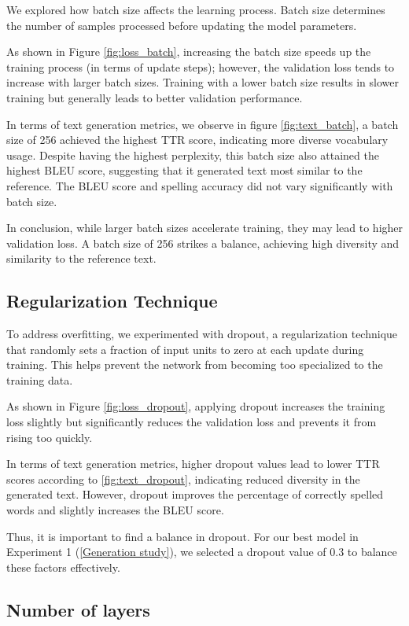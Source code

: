 \documentclass{article}
\begin{document}
We explored how batch size affects the learning process. Batch size determines the number of samples processed before updating the model parameters.

As shown in Figure \ref{fig:loss_batch}, increasing the batch size speeds up the training process (in terms of update steps); however, the validation loss tends to increase with larger batch sizes. Training with a lower batch size results in slower training but generally leads to better validation performance.

In terms of text generation metrics, we observe in figure \ref{fig:text_batch}, a batch size of 256 achieved the highest TTR score, indicating more diverse vocabulary usage. Despite having the highest perplexity, this batch size also attained the highest BLEU score, suggesting that it generated text most similar to the reference. The BLEU score and spelling accuracy did not vary significantly with batch size.

In conclusion, while larger batch sizes accelerate training, they may lead to higher validation loss. A batch size of 256 strikes a balance, achieving high diversity and similarity to the reference text.

\subsection{Regularization Technique}

To address overfitting, we experimented with dropout, a regularization technique that randomly sets a fraction of input units to zero at each update during training. This helps prevent the network from becoming too specialized to the training data.

As shown in Figure \ref{fig:loss_dropout}, applying dropout increases the training loss slightly but significantly reduces the validation loss and prevents it from rising too quickly.

In terms of text generation metrics, higher dropout values lead to lower TTR scores according to \ref{fig:text_dropout}, indicating reduced diversity in the generated text. However, dropout improves the percentage of correctly spelled words and slightly increases the BLEU score.

Thus, it is important to find a balance in dropout. For our best model in Experiment 1 (\ref{Generation study}), we selected a dropout value of 0.3 to balance these factors effectively.

\subsection{Number of layers}
\end{document}
